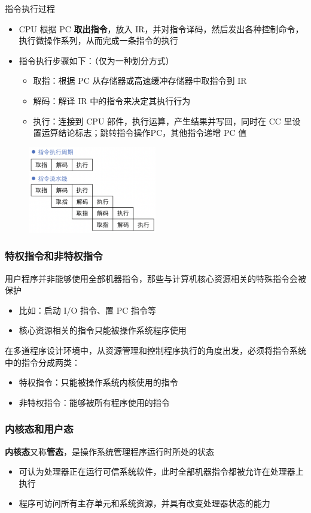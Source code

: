 \documentclass[cs4size,a4paper,10pt]{ctexart}
\begin{document}
	指令执行过程
	\begin{itemize}
		\item CPU 根据 PC \textbf{取出指令}，放入 IR，并对指令译码，然后发出各种控制命令，执行微操作系列，从而完成一条指令的执行
		\item 指令执行步骤如下：（仅为一种划分方式）
		\begin{itemize}
			\item 取指：根据 PC 从存储器或高速缓冲存储器中取指令到 IR
			\item 解码：解译 IR 中的指令来决定其执行行为
			\item 执行：连接到 CPU 部件，执行运算，产生结果并写回，同时在 CC 里设置运算结论标志；跳转指令操作PC，其他指令递增 PC 值
		\end{itemize}
	\end{itemize}
	\begin{figure}[H]
		\centering
		\includegraphics[width=0.5\textwidth]{img/2.1.2.1}
	\end{figure}

	\subsubsection{特权指令和非特权指令}
	用户程序并非能够使用全部机器指令，那些与计算机核心资源相关的特殊指令会被保护
	\begin{itemize}
		\item 比如：启动 I/O 指令、置 PC 指令等
		\item 核心资源相关的指令只能被操作系统程序使用
	\end{itemize}

	在多道程序设计环境中，从资源管理和控制程序执行的角度出发，必须将指令系统中的指令分成两类：
	\begin{itemize}
		\item 特权指令：只能被操作系统内核使用的指令
		\item 非特权指令：能够被所有程序使用的指令
	\end{itemize}


	\subsubsection{内核态和用户态}
	\textbf{内核态}又称\textbf{管态}，是操作系统管理程序运行时所处的状态
	\begin{itemize}
		\item 可认为处理器正在运行可信系统软件，此时全部机器指令都被允许在处理器上执行
		\item 程序可访问所有主存单元和系统资源，并具有改变处理器状态的能力
	\end{itemize}
\end{document}
